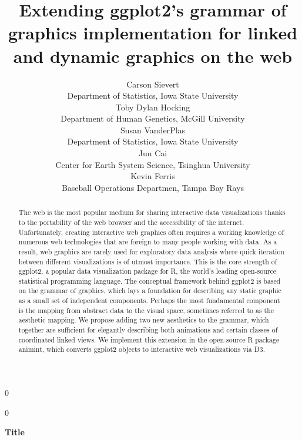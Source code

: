\documentclass[12pt]{article}\usepackage[]{graphicx}\usepackage[]{color}
\newcommand{\blind}{0}
\begin{document}
%

\def\spacingset#1{\renewcommand{\baselinestretch}%
{#1}\small\normalsize} \spacingset{1}



\blind
{
  \title{\bf Extending ggplot2's grammar of graphics implementation for linked and dynamic graphics on the web}
  \author{Carson Sievert \\
    Department of Statistics, Iowa State University \\
    Toby Dylan Hocking \\
    Department of Human Genetics, McGill University \\
    Susan VanderPlas \\
    Department of Statistics, Iowa State University \\
    Jun Cai \\
    Center for Earth System Science, Tsinghua University \\
    Kevin Ferris \\
    Baseball Operations Departmen, Tampa Bay Rays}
  \maketitle
} \fi

\blind
{
  \bigskip
  \bigskip
  \bigskip
  \begin{center}
    {\LARGE\bf Title}
\end{center}
  \medskip
} \fi

\bigskip
\begin{abstract}
The web is the most popular medium for sharing interactive
  data visualizations thanks to the portability of the web browser and
  the accessibility of the internet. Unfortunately, creating
  interactive web graphics often requires a working knowledge of
  numerous web technologies that are foreign to many people working
  with data. As a result, web graphics are rarely used for exploratory
  data analysis where quick iteration between different visualizations
  is of utmost importance. This is the core strength of ggplot2, a
  popular data visualization package for R, the world's leading
  open-source statistical programming language. The conceptual
  framework behind ggplot2 is based on the grammar of graphics, which
  lays a foundation for describing any static graphic as a small set
  of independent components. Perhaps the most fundamental component is
  the mapping from abstract data to the visual space, sometimes
  referred to as the aesthetic mapping. We propose adding two new
  aesthetics to the grammar, which together are sufficient for
  elegantly describing both animations and certain classes of
  coordinated linked views. We implement this extension in the
  open-source R package animint, which converts ggplot2 objects to
  interactive web visualizations via D3.  
\end{abstract}
\end{document}
